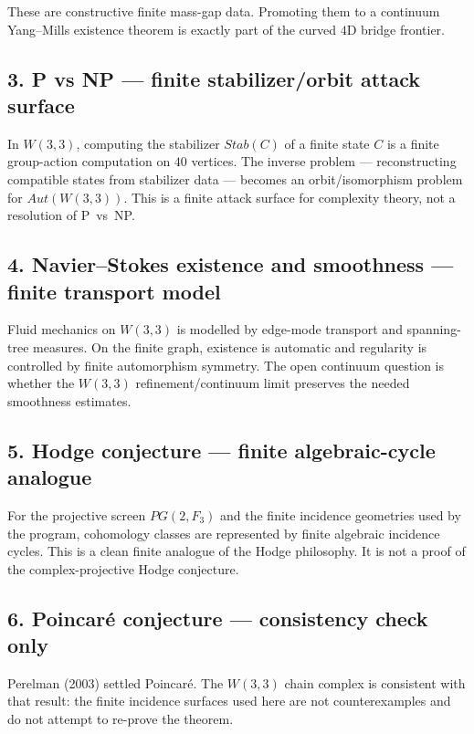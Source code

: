 \documentclass[11pt]{article}
\def\mathbb#1{#1}%
\def\mathrm#1{#1}%
\def\mathcal#1{#1}%
\begin{document}
These are constructive finite mass-gap data. Promoting them to a continuum Yang--Mills existence theorem is exactly part of the curved $4$D bridge frontier.

\subsection*{3. P vs NP --- finite stabilizer/orbit attack surface}

In $W(3,3)$, computing the stabilizer $\mathrm{Stab}(\mathcal{C})$ of a finite state $\mathcal{C}$ is a finite group-action computation on $40$ vertices. The inverse problem --- reconstructing compatible states from stabilizer data --- becomes an orbit/isomorphism problem for $\mathrm{Aut}(W(3,3))$. This is a finite attack surface for complexity theory, not a resolution of P~vs~NP.

\subsection*{4. Navier--Stokes existence and smoothness --- finite transport model}

Fluid mechanics on $W(3,3)$ is modelled by edge-mode transport and spanning-tree measures. On the finite graph, existence is automatic and regularity is controlled by finite automorphism symmetry. The open continuum question is whether the $W(3,3)$ refinement/continuum limit preserves the needed smoothness estimates.

\subsection*{5. Hodge conjecture --- finite algebraic-cycle analogue}

For the projective screen $\mathrm{PG}(2,\mathbb{F}_3)$ and the finite incidence geometries used by the program, cohomology classes are represented by finite algebraic incidence cycles. This is a clean finite analogue of the Hodge philosophy. It is not a proof of the complex-projective Hodge conjecture.

\subsection*{6. Poincaré conjecture --- consistency check only}

Perelman (2003) settled Poincaré. The $W(3,3)$ chain complex is consistent with that result: the finite incidence surfaces used here are not counterexamples and do not attempt to re-prove the theorem.
\end{document}

